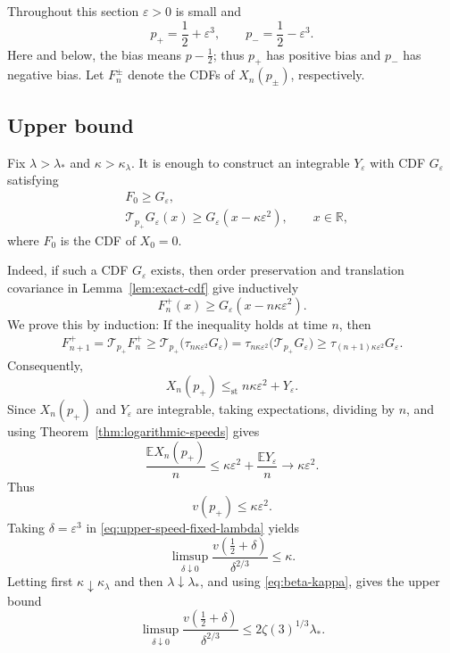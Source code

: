 \documentclass[12pt]{amsart}
\numberwithin{equation}{section}
\theoremstyle{plain}
\theoremstyle{definition}
\newcommand{\E}{\mathbb E}
\newcommand{\stle}{\le_{\mathrm{st}}}
\begin{document}
Throughout this section $\varepsilon>0$ is small and
\[
 p_+=\frac12+\varepsilon^3,
 \qquad
 p_-=\frac12-\varepsilon^3.
\]
Here and below, the bias means $p-\frac{1}{2}$; thus $p_+$ has positive
bias and $p_-$ has negative bias.  Let $F_n^\pm$ denote the CDFs of
$X_n(p_\pm)$, respectively.

\subsection{Upper bound}

Fix $\lambda>\lambda_*$ and $\kappa>\kappa_{\lambda}$.  It is enough to construct an
integrable $Y_\varepsilon$ with CDF $G_\varepsilon$ satisfying
\begin{align}
 &F_0\ge G_\varepsilon, \label{upp_barrier_init}\\
 &\mathcal T_{p_+}G_\varepsilon(x)
 \ge G_\varepsilon(x-\kappa\varepsilon^2),
 \qquad x\in\mathbb R,\label{upp_barrier_ineq}
\end{align}
where $F_0$ is the CDF of $X_0=0$.

Indeed, if such a CDF $G_\varepsilon$ exists, then order preservation and
translation covariance in Lemma~\ref{lem:exact-cdf} give inductively
\[
 F_n^+(x)\ge G_\varepsilon(x-n\kappa\varepsilon^2).
\]
We prove this by induction: If the inequality holds at time $n$, then
\[
\begin{aligned}
 F_{n+1}^+
 =\mathcal T_{p_+}F_n^+
 \ge \mathcal T_{p_+}
     \bigl(\tau_{n\kappa\varepsilon^2}G_\varepsilon\bigr)
 =\tau_{n\kappa\varepsilon^2}
     \bigl(\mathcal T_{p_+}G_\varepsilon\bigr)
 \ge\tau_{(n+1)\kappa\varepsilon^2}G_\varepsilon.
\end{aligned}
\]
Consequently,
\[
 X_n(p_+)\stle n\kappa\varepsilon^2+Y_\varepsilon.
\]
Since $X_n(p_+)$ and $Y_\varepsilon$ are integrable, taking expectations,
dividing by $n$, and using Theorem~\ref{thm:logarithmic-speeds} gives
\[
 \frac{\E X_n(p_+)}n
 \le \kappa\varepsilon^2+\frac{\E Y_\varepsilon}n
 \longrightarrow \kappa\varepsilon^2.
\]
Thus
\begin{equation}
 v(p_+)\le\kappa\varepsilon^2.
 \label{eq:upper-speed-fixed-lambda}
\end{equation}
Taking $\delta=\varepsilon^3$ in
\eqref{eq:upper-speed-fixed-lambda} yields
\[
 \limsup_{\delta\downarrow0}
 \frac{v(\frac12+\delta)}{\delta^{2/3}}
 \le\kappa.
\]
Letting first $\kappa\downarrow\kappa_{\lambda}$ and then
$\lambda\downarrow\lambda_*$, and using \eqref{eq:beta-kappa}, gives the upper bound
\begin{equation}
 \limsup_{\delta\downarrow0}
 \frac{v(\frac12+\delta)}{\delta^{2/3}}
 \le2\zeta(3)^{1/3}\lambda_*.
 \label{eq:sharp-upper-bound}
\end{equation}
\end{document}

